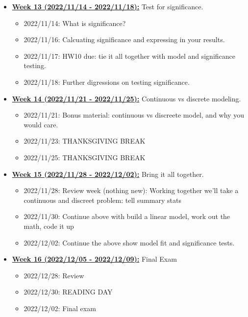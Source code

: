 \documentclass[11pt]{article}
\begin{document}
\begin{itemize}
  \item \underline{\textbf{Week 13 (2022/11/14 - 2022/11/18):}} Test for significance. 
  \begin{itemize}
    \item 2022/11/14: What is significance?
    \item 2022/11/16: Calcuating significance and expressing in your results. 
    \item 2022/11/17: HW10 due: tie it all together with model and significance testing. 
    \item 2022/11/18: Further digressions on testing significance. 
  \end{itemize}


  \item \underline{\textbf{Week 14 (2022/11/21 - 2022/11/25):}} Continuous vs discrete modeling. 
  \begin{itemize}
    \item 2022/11/21: Bonus material: continuous vs discreete model, and why you would care. 
    \item 2022/11/23: THANKSGIVING BREAK
    \item 2022/11/25: THANKSGIVING BREAK
  \end{itemize}


  \item \underline{\textbf{Week 15 (2022/11/28 - 2022/12/02):}} Bring it all together. 
  \begin{itemize}
    \item 2022/11/28: Review week (nothing new): Working together we'll take a continuous and discreet problem: tell summary stats
    \item 2022/11/30: Continue above with build a linear model, work out the math, code it up
    \item 2022/12/02: Continue the above show model fit and significance tests. 
  \end{itemize}

  \item \underline{\textbf{Week 16 (2022/12/05 - 2022/12/09):}} Final Exam
  \begin{itemize}
    \item 2022/12/28: Review
    \item 2022/12/30: READING DAY
    \item 2022/12/02: Final exam
  \end{itemize}
\end{itemize}
\end{document}
